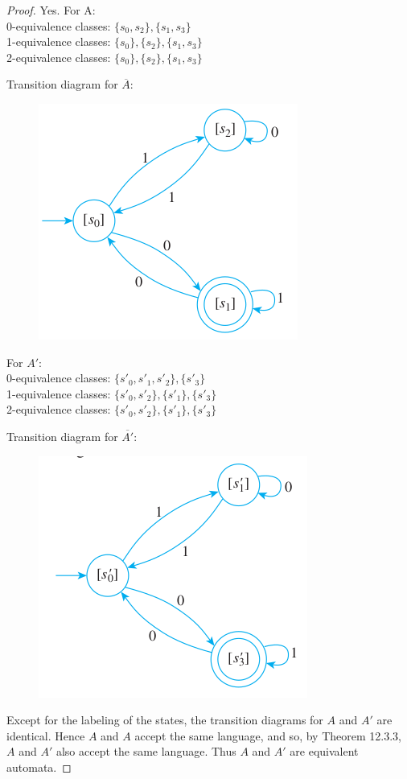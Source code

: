 \documentclass[14pt]{extarticle}
\begin{document}
\begin{proof}
Yes. For A: \\
0-equivalence classes: \(\{s_0, s_2\}, \{s_1, s_3\}\) \\
1-equivalence classes: \(\{s_0\}, \{s_2\}, \{s_1, s_3\}\) \\
2-equivalence classes: \(\{s_0\}, \{s_2\}, \{s_1, s_3\}\)

Transition diagram for \(\overline{A}\):

\begin{figure}[ht!]
\centering
\includegraphics[scale=0.4]{../images/12.3.7.a.png}
\end{figure}

For \(A'\): \\
0-equivalence classes: \(\{s'_0, s'_1, s'_2\}, \{s'_3\}\) \\
1-equivalence classes: \(\{s'_0, s'_2\}, \{s'_1\}, \{s'_3\}\) \\
2-equivalence classes: \(\{s'_0, s'_2\}, \{s'_1\}, \{s'_3\}\)

Transition diagram for \(\overline{A'}\):

\begin{figure}[ht!]
\centering
\includegraphics[scale=0.5]{../images/12.3.7.b.png}
\end{figure}

Except for the labeling of the states, the transition diagrams for \(A\) and \(A'\) are identical. Hence \(A\) and \(A\) 
accept the same language, and so, by Theorem 12.3.3, \(A\) and \(A'\) also accept the same language. Thus \(A\) and \(A'\) 
are equivalent automata.
\end{proof}
\end{document}
